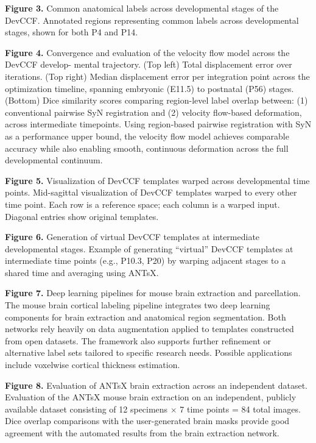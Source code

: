 \documentclass[
  12pt,
]{article}
\begin{document}
\textbf{Figure 3.} Common anatomical labels across developmental stages
of the DevCCF. Annotated regions representing common labels across
developmental stages, shown for both P4 and P14.

\textbf{Figure 4.} Convergence and evaluation of the velocity flow model
across the DevCCF develop- mental trajectory. (Top left) Total
displacement error over iterations. (Top right) Median displacement
error per integration point across the optimization timeline, spanning
embryonic (E11.5) to postnatal (P56) stages. (Bottom) Dice similarity
scores comparing region-level label overlap between: (1) conventional
pairwise SyN registration and (2) velocity flow-based deformation,
across intermediate timepoints. Using region-based pairwise registration
with SyN as a performance upper bound, the velocity flow model achieves
comparable accuracy while also enabling smooth, continuous deformation
across the full developmental continuum.

\textbf{Figure 5.} Visualization of DevCCF templates warped across
developmental time points. Mid-sagittal visualization of DevCCF
templates warped to every other time point. Each row is a reference
space; each column is a warped input. Diagonal entries show original
templates.

\textbf{Figure 6.} Generation of virtual DevCCF templates at
intermediate developmental stages. Example of generating ``virtual''
DevCCF templates at intermediate time points (e.g., P10.3, P20) by
warping adjacent stages to a shared time and averaging using ANTsX.

\textbf{Figure 7.} Deep learning pipelines for mouse brain extraction
and parcellation. The mouse brain cortical labeling pipeline integrates
two deep learning components for brain extraction and anatomical region
segmentation. Both networks rely heavily on data augmentation applied to
templates constructed from open datasets. The framework also supports
further refinement or alternative label sets tailored to specific
research needs. Possible applications include voxelwise cortical
thickness estimation.

\textbf{Figure 8.} Evaluation of ANTsX brain extraction across an
independent dataset. Evaluation of the ANTsX mouse brain extraction on
an independent, publicly available dataset consisting of 12 specimens
\(\times\) 7 time points = 84 total images. Dice overlap comparisons
with the user-generated brain masks provide good agreement with the
automated results from the brain extraction network.
\end{document}
